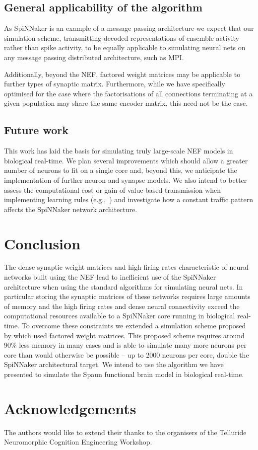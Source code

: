 \documentclass[conference]{IEEEtran}
\begin{document}
  \subsection{General applicability of the algorithm}

  As SpiNNaker is an example of a message passing architecture we expect that our simulation scheme, transmitting decoded representations of ensemble activity rather than spike activity, to be equally applicable to simulating neural nets on any message passing distributed architecture, such as MPI.

  Additionally, beyond the NEF, factored weight matrices may be applicable to further types of synaptic matrix.
  Furthermore, while we have specifically optimised for the case where the factorisations of all connections terminating at a given population may share the same encoder matrix, this need not be the case.

  \subsection{Future work}

  This work has laid the basis for simulating truly large-scale NEF models in biological real-time.
  We plan several improvements which should allow a greater number of neurons to fit on a single core and, beyond this, we anticipate the implementation of further neuron and synapse models.
  We also intend to better assess the computational cost or gain of value-based transmission when implementing learning rules (e.g.,~\parencite{Voelker2014}) and investigate how a constant traffic pattern affects the SpiNNaker network architecture.

  \section{Conclusion}

  The dense synaptic weight matrices and high firing rates characteristic of neural networks built using the NEF lead to inefficient use of the SpiNNaker architecture when using the standard algorithms for simulating neural nets.
  In particular storing the synaptic matrices of these networks requires large amounts of memory and the high firing rates and dense neural connectivity exceed the computational resources available to a SpiNNaker core running in biological real-time.
  To overcome these constraints we extended a simulation scheme proposed by \textcite*{Bekolay2014} which used factored weight matrices.
  This proposed scheme requires around 90\% less memory in many cases and is able to simulate many more neurons per core than would otherwise be possible -- up to 2000 neurons per core, double the SpiNNaker architectural target.
  We intend to use the algorithm we have presented to simulate the Spaun functional brain model in biological real-time.

  \section*{Acknowledgements}

The authors would like to extend their thanks to the organisers of the Telluride Neuromorphic Cognition Engineering Workshop.

  \printbibliography
\end{document}
